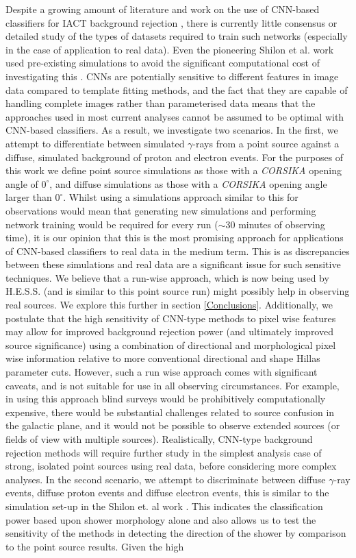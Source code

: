 Despite a growing amount of literature and work on the use of CNN-based classifiers for IACT background rejection \cite{Shilon} \cite{samicrc} \cite{dl1dh}, there is currently little consensus or detailed study of the types of datasets required to train such networks (especially in the case of application to real data). Even the pioneering Shilon et al. work used pre-existing simulations to avoid the significant computational cost of investigating this \cite{Shilon}. CNNs are potentially sensitive to different features in image data compared to template fitting methods, and the fact that they are capable of handling complete images rather than parameterised data means that the approaches used in most current analyses cannot be assumed to be optimal with CNN-based classifiers. As a result, we investigate two scenarios. In the first, we attempt to differentiate between simulated $\gamma$-rays from a point source against a diffuse, simulated background of proton and electron events. For the purposes of this work we define point source simulations as those with a \textit{CORSIKA} opening angle of $0^{\circ}$, and diffuse simulations as those with a \textit{CORSIKA} opening angle larger than $0^{\circ}$. Whilst using a simulations approach similar to this for observations would mean that generating new simulations and performing network training would be required for every run ($\sim$30 minutes of observing time), it is our opinion that this is the most promising approach for applications of CNN-based classifiers to real data in the medium term. This is as discrepancies between these simulations and real data are a significant issue for such sensitive techniques. We believe that a run-wise approach, which is now being used by H.E.S.S. \cite{rws} (and is similar to this point source run) might possibly help in observing real sources. We explore this further in section \ref{Conclusions}. Additionally, we postulate that the high sensitivity of CNN-type methods to pixel wise features may allow for improved background rejection power (and ultimately improved source significance) using a combination of directional and morphological pixel wise information relative to more conventional directional and shape Hillas parameter cuts. However, such a run wise approach comes with significant caveats, and is not suitable for use in all observing circumstances. For example, in using this approach blind surveys would be prohibitively computationally expensive, there would be substantial challenges related to source confusion in the galactic plane, and it would not be possible to observe extended sources (or fields of view with multiple sources). Realistically, CNN-type background rejection methods will require further study in the simplest analysis case of strong, isolated point sources using real data, before considering more complex analyses. In the second scenario, we attempt to discriminate between diffuse $\gamma$-ray events, diffuse proton events and diffuse electron events, this is similar to the simulation set-up in the Shilon et. al work \cite{Shilon}. This indicates the classification power based upon shower morphology alone and also allows us to test the sensitivity of the methods in detecting the direction of the shower by comparison to the point source results. Given the high 